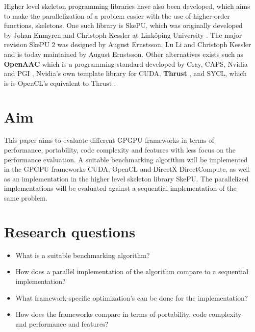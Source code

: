 Higher level skeleton programming libraries have also been developed, which aims to make the parallelization of a problem easier with the use of higher-order functions, skeletons. One such library is SkePU, which was originally developed by Johan Enmyren and Christoph Kessler at Linköping University \cite{enmyren2010skepu}. The major revision SkePU 2 was designed by August Ernstsson, Lu Li and Christoph Kessler and is today maintained by August Ernstsson. Other alternatives exists such as \textbf{OpenAAC} which is a programming standard developed by Cray, CAPS, Nvidia and PGI \cite{OpenACC}, Nvidia's own template library for CUDA, \textbf{Thrust} \cite{Thrust}, and SYCL, which is is OpenCL's equivalent to Thrust \cite{SYCL}.


\section{Aim} %

This paper aims to evaluate different GPGPU frameworks in terms of performance, portability, code complexity and features with less focus on the performance evaluation. A suitable benchmarking algorithm will be implemented in the GPGPU frameworks CUDA, OpenCL and DirectX DirectCompute, as well as an implementation in the higher level skeleton library SkePU. The parallelized implementations will be evaluated against a sequential implementation of the same problem.


\section{Research questions}  %

\begin{itemize}
    \item What is a suitable benchmarking algorithm?
    \item How does a parallel implementation of the algorithm compare to a sequential implementation?
    \item What framework-specific optimization's can be done for the implementation?
    \item How does the frameworks compare in terms of portability, code complexity and performance and features?
\end{itemize}


